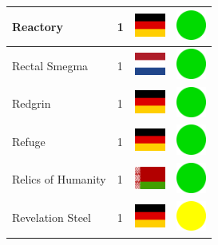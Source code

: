 \documentclass[12pt, a4paper, twoside]{report}
\begin{document}
\begin{center}
\begin{longtable}{|p{5cm}|p{2cm}|p{2cm}|p{2cm}|}
			Reactory & 1 & \includegraphics[width=1cm]{4x3/de} & \includegraphics[width=1cm]{likes/y} \\ \hline
			Rectal Smegma & 1 & \includegraphics[width=1cm]{4x3/nl} & \includegraphics[width=1cm]{likes/y} \\ \hline
			Redgrin & 1 & \includegraphics[width=1cm]{4x3/de} & \includegraphics[width=1cm]{likes/y} \\ \hline
			Refuge & 1 & \includegraphics[width=1cm]{4x3/de} & \includegraphics[width=1cm]{likes/y} \\ \hline
			Relics of Humanity & 1 & \includegraphics[width=1cm]{4x3/by} & \includegraphics[width=1cm]{likes/y} \\ \hline
			Revelation Steel & 1 & \includegraphics[width=1cm]{4x3/de} & \includegraphics[width=1cm]{likes/m} \\ \hline

\end{longtable}
\end{center}
\end{document}
